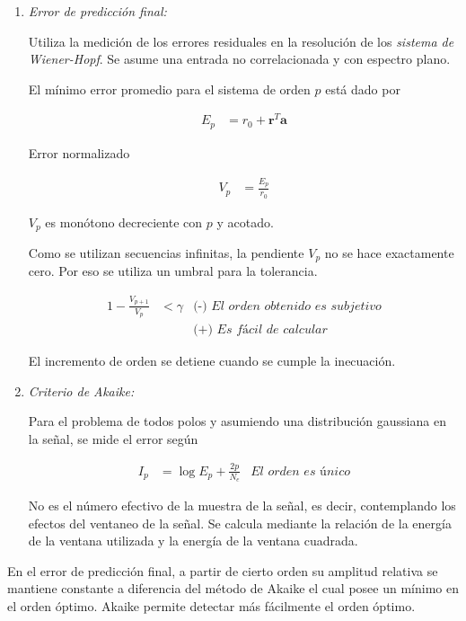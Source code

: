 \documentclass[a4paper,10pt,spanish,oneside]{article}
\begin{document}
\begin{enumerate}[1.]
\item \textit{Error de predicción final:}

Utiliza la medición de los errores residuales en la resolución de los \textit{sistema de Wiener-Hopf}. Se asume una entrada no correlacionada y con espectro plano.

El mínimo error promedio para el sistema de orden $p$ está dado por

\begin{align*}
E_{p} &= r_{0}+\mathbf{r}^{T}\mathbf{a}
\end{align*}

Error normalizado

\begin{align*}
V_{p} &= \frac{E_{p}}{r_{0}}
\end{align*}

$V_{p}$ es monótono decreciente con $p$ y acotado.

Como se utilizan secuencias infinitas, la pendiente $V_{p}$ no se hace exactamente cero. Por eso se utiliza un umbral para la tolerancia.

\begin{align*}
1-\frac{V_{p+1}}{V_{p}} &< \gamma & \textit{(-) El orden obtenido es subjetivo} \\
&& \textit{(+) Es fácil de calcular}
\end{align*}

El incremento de orden se detiene cuando se cumple la inecuación.

\item \textit{Criterio de Akaike:}

Para el problema de todos polos y asumiendo una distribución gaussiana en la señal, se mide el error según

\begin{align*}
I_{p} &= \log{E_{p}}+\frac{2p}{N_{e}} & \textit{El orden es único}
\end{align*}

No es el número efectivo de la muestra de la señal, es decir, contemplando los efectos del ventaneo de la señal. Se calcula mediante la relación de la energía de la ventana utilizada y la energía de la ventana cuadrada.

\end{enumerate}

En el error de predicción final, a partir de cierto orden su amplitud relativa se mantiene constante a diferencia del método de Akaike el cual posee un mínimo en el orden óptimo. Akaike permite detectar más fácilmente el orden óptimo.
\end{document}

